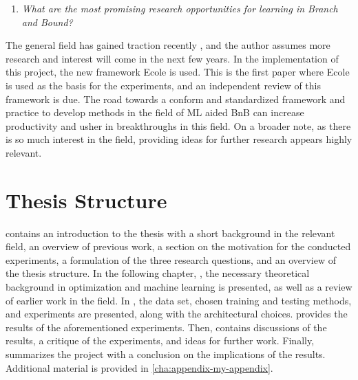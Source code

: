 %
\begin{enumerate}[resume*]
    \item \textit{What are the most promising research opportunities for learning in Branch and Bound?}
\end{enumerate}
%
The general field has gained traction recently \cite{bengio2020machine}, and the author assumes more research and interest will come in the next few years. In the implementation of this project, the new framework \gls{Ecole} is used. This is the first paper where \gls{Ecole} is used as the basis for the experiments, and an independent review of this framework is due. The road towards a conform and standardized framework and practice to develop methods in the field of \gls{ML} aided \Gls{BnB} can increase productivity and usher in breakthroughs in this field. On a broader note, as there is so much interest in the field, providing ideas for further research appears highly relevant. 



\section{Thesis Structure}\label{sec:int_structure}


 contains an introduction to the thesis with a short background in the relevant field, an overview of previous work, a section on the motivation for the conducted experiments, a formulation of the three research questions, and an overview of the thesis structure. 
In the following chapter, , the necessary theoretical background in optimization and machine learning is presented, as well as a review of earlier work in the field. In , the data set, chosen training and testing methods, and experiments are presented, along with the architectural choices.  provides the results of the aforementioned experiments. Then,  contains discussions of the results, a critique of the experiments, and ideas for further work. Finally,  summarizes the project with a conclusion on the implications of the results. Additional material is provided in \cref{cha:appendix-my-appendix}.
